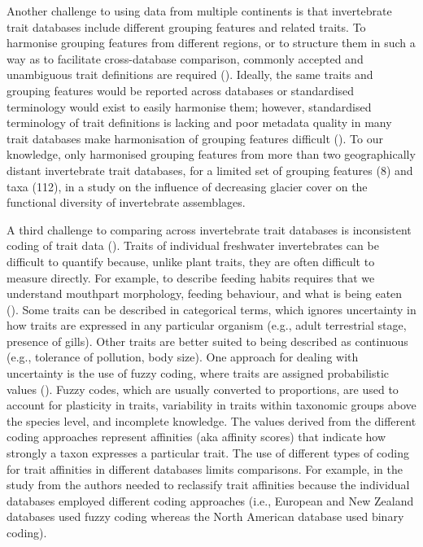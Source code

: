\documentclass[12pt]{article}
\begin{document}
Another challenge to using data from multiple continents is that invertebrate trait databases include different grouping features and related traits. To harmonise grouping features from different regions, or to structure them in such a way as to facilitate cross-database comparison, commonly accepted and unambiguous trait definitions are required (\cite{schneider_towards_2019}). Ideally, the same traits and grouping features would be reported across databases or standardised terminology would exist to easily harmonise them; however, standardised terminology of trait definitions is lacking and poor metadata quality in many trait databases make harmonisation of grouping features difficult (\cite{baird_toward_2011, kissling_towards_2018}). To our knowledge, only \citet{brown_functional_2018} harmonised grouping features from more than two geographically distant invertebrate trait databases, for a limited set of grouping features (8) and taxa (112), in a study on the influence of decreasing glacier cover on the functional diversity of invertebrate assemblages.

A third challenge to comparing across invertebrate trait databases is inconsistent coding of trait data (\cite{culp_incorporating_2011}). Traits of individual freshwater invertebrates can be difficult to quantify because, unlike plant traits, they are often difficult to measure directly. For example, to describe feeding habits requires that we understand mouthpart morphology, feeding behaviour, and what is being eaten (\cite{moog_comprehensive_nodate}). Some traits can be described in categorical terms, which ignores uncertainty in how traits are expressed in any particular organism (e.g., adult terrestrial stage, presence of gills). Other traits are better suited to being described as continuous (e.g., tolerance of pollution, body size). One approach for dealing with uncertainty is the use of fuzzy coding, where traits are assigned probabilistic values (\cite{chevenet_francois_fuzzy_1994}). Fuzzy codes, which are usually converted to proportions, are used to account for plasticity in traits, variability in traits within taxonomic groups above the species level, and incomplete knowledge. The values derived from the different coding approaches represent affinities (aka affinity scores) that indicate how strongly a taxon expresses a particular trait. The use of different types of coding for trait affinities in different databases limits comparisons. For example, in the study from \citet{brown_functional_2018} the authors needed to reclassify trait affinities because the individual databases employed different coding approaches (i.e., European and New Zealand databases used fuzzy coding whereas the North American database used binary coding). 
\end{document}
